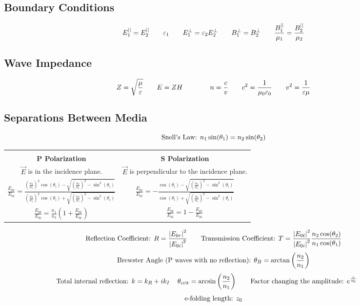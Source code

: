 \documentclass{article}
\begin{document}
\subsection*{Boundary Conditions}
\[E_1^{||}=E_2^{||}\hspace{7 mm}\varepsilon_1\hspace{7 mm}E_1^\perp=\varepsilon_2E_2^\perp\hspace{7 mm}B_1^\perp=B_2^\perp\hspace{7 mm}\frac{B_1^{||}}{\mu_1}=\frac{B_2^{||}}{\mu_2}\]
\subsection*{Wave Impedance}
\[Z=\sqrt{\frac{\mu}{\varepsilon}}\hspace{7 mm}E=ZH\hspace{7 mm}\hspace{7 mm}n=\frac{c}{v}\hspace{7 mm}c^2=\frac{1}{\mu_0\varepsilon_0}\hspace{7 mm}v^2=\frac{1}{\varepsilon\mu}\]
\subsection*{Separations Between Media}
\[\textnormal{Snell's Law: }n_1\sin(\theta_1)=n_2\sin(\theta_2)\]
\begin{center}
\begin{tabular}{|| c c ||}
\hline
&\\
\textbf{P Polarization} & \textbf{S Polarization} \\[10pt]
\(\overrightarrow{E}\) is in the incidence plane. & \(\overrightarrow{E}\) is perpendicular to the incidence plane.\\[10pt]
\(\frac{E_{0r}}{E_{0i}}=\frac{\left(\frac{n_2}{n_1}\right)^2\cos(\theta_i)-\sqrt{\left(\frac{n_2}{n_1}\right)^2-\sin^2(\theta_i)}}{\left(\frac{n_2}{n_1}\right)^2\cos(\theta_i)+\sqrt{\left(\frac{n_2}{n_1}\right)^2-\sin^2(\theta_i)}}\) & \(\frac{E_{0r}}{E_{0i}}=-\frac{\cos(\theta_i)-\sqrt{\left(\frac{n_2}{n_1}\right)^2-\sin^2(\theta_i)}}{\cos(\theta_i)+\sqrt{\left(\frac{n_2}{n_1}\right)^2-\sin^2(\theta_i)}}\)\\[15pt]
\(\frac{E_{0t}}{E_{0i}}=\frac{n_1}{n_2}\left(1+\frac{E_{0r}}{E_{0i}}\right)\) & \(\frac{E_{0t}}{E_{0i}}=1-\frac{E_{0r}}{E_{0i}}\) \\[10pt]
\hline
\end{tabular}
\end{center}
\[\textnormal{Reflection Coefficient: }R=\frac{\left|E_{0r}\right|^2}{\left|E_{0i}\right|^2}\hspace{7 mm}\textnormal{Transmission Coefficient: }T=\frac{\left|E_{0t}\right|^2}{\left|E_{0i}\right|^2}\frac{n_2\cos(\theta_2)}{n_1\cos(\theta_1)}\]
\[\textnormal{Brewster Angle (P waves with no reflection): } \theta_B=\arctan\left(\frac{n_2}{n_1}\right)\]
\[\textnormal{Total internal reflection: }k=k_R+ik_I\hspace{4 mm}\theta_\textnormal{crit}=\arcsin\left(\frac{n_2}{n_1}\right)\hspace{7 mm}\textnormal{Factor changing the amplitude: }e^{\frac{z}{z_0}}\hspace{7 mm}\]
\[\textnormal{e-folding length: }z_0\]
\end{document}
